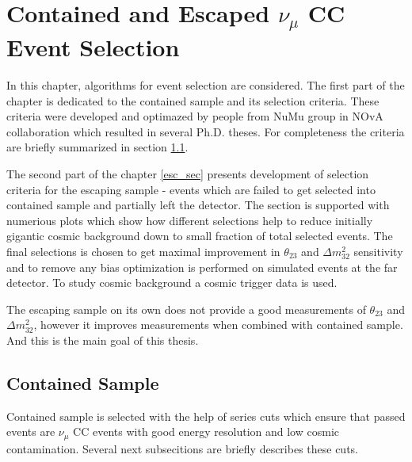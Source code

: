 \chapter{Contained and Escaped $\nu_\mu$ CC Event Selection}
\label{event_selection_chapter}

In this chapter, algorithms for event selection are
considered. The first part of the chapter is dedicated to the contained sample and its selection 
criteria. These criteria were developed and optimazed by people from NuMu group in NOvA collaboration 
which resulted in several Ph.D. theses. For completeness the criteria are briefly summarized in
section \ref{cont_sec}.

The second part of the chapter \ref{esc_sec} presents development of selection criteria for
the escaping sample - events which are failed to get selected into contained sample and 
partially left the detector. The section is supported with numerious plots which show how 
different selections help to reduce initially gigantic cosmic background down to small fraction
of total selected events. The final selections is chosen to get maximal improvement in 
$\theta_{23}$ and $\Delta m_{32}^2$ sensitivity and to remove any bias optimization is performed
on simulated events at the far detector. To study cosmic background a cosmic trigger data is used.

The escaping sample on its own does not provide a good measurements of $\theta_{23}$ and 
$\Delta m_{32}^2$, however it improves measurements when combined with contained sample. And this
is the main goal of this thesis. 

\section{Contained Sample} \label{cont_sec}
Contained sample is selected with the help of series cuts which ensure that passed events
are $\nu_\mu$ CC events with good energy resolution and low cosmic contamination. Several
next subsecitions are briefly describes these cuts.

